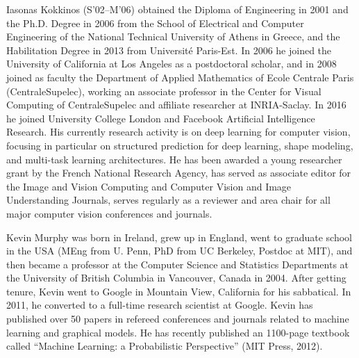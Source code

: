 \documentclass[10pt,journal,compsoc]{IEEEtran}
\begin{document}
\begin{IEEEbiography}{Iasonas Kokkinos}
(S'02--M'06) obtained the Diploma of Engineering in 2001 and the Ph.D. Degree in 2006 from the School of Electrical and Computer Engineering of the National Technical University of Athens in Greece, and the Habilitation Degree in 2013 from Université Paris-Est. In 2006 he joined the University of California at Los Angeles as a postdoctoral scholar, and in 2008 joined as faculty the Department of Applied Mathematics of Ecole Centrale Paris (CentraleSupelec), working an associate professor in the Center for Visual Computing of CentraleSupelec and affiliate researcher at INRIA-Saclay. In 2016 he joined University College London and Facebook Artificial Intelligence Research. His currently research activity is on deep learning for computer vision, focusing in particular on structured prediction for deep learning, shape modeling, and multi-task learning architectures. He has been awarded a young researcher grant by the French National Research Agency, has served as associate editor for the Image and Vision Computing and Computer Vision and Image Understanding Journals, serves regularly as a reviewer and area chair for all major computer vision conferences and journals.
\end{IEEEbiography}

\begin{IEEEbiography}{Kevin Murphy}
was born in Ireland, grew
up  in  England,  went  to  graduate  school  in  the
USA (MEng from U. Penn, PhD from UC Berkeley,
Postdoc at MIT), and then became a professor at
the Computer Science and Statistics Departments at
the University of British Columbia in
Vancouver, Canada in 2004. After getting tenure,
Kevin  went  to  Google  in  Mountain  View,  California
for his sabbatical. In 2011, he converted
to a full-time research scientist at Google. Kevin
has published over 50 papers in refereed conferences
and journals related to machine learning and graphical models.
He  has  recently  published  an  1100-page  textbook  called
``Machine Learning: a Probabilistic Perspective''
(MIT Press, 2012).
\end{IEEEbiography}
\end{document}
